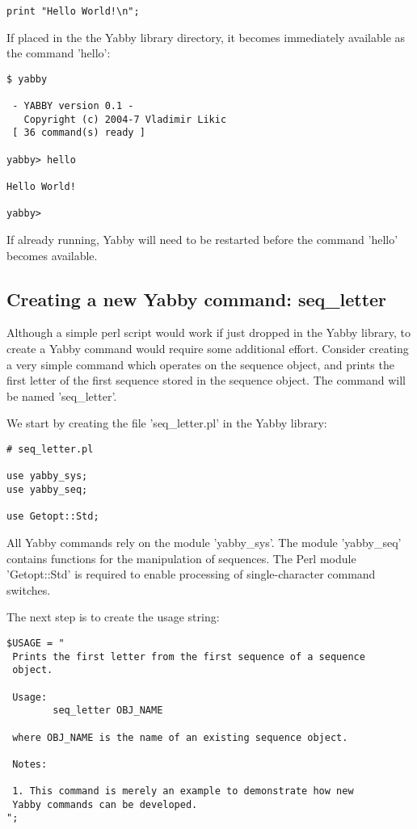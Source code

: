 \begin{verbatim}
print "Hello World!\n";
\end{verbatim}

If placed in the the Yabby library directory, it becomes immediately
available as the command 'hello':

\begin{verbatim}
$ yabby

 - YABBY version 0.1 - 
   Copyright (c) 2004-7 Vladimir Likic
 [ 36 command(s) ready ]

yabby> hello

Hello World!

yabby>
\end{verbatim}

If already running, Yabby will need to be restarted before the command
'hello' becomes available.

\subsection{Creating a new Yabby command: seq\_letter}

Although a simple perl script would work if just dropped in the Yabby
library, to create a Yabby command would require some additional effort.
Consider creating a very simple command which operates on the sequence
object, and prints the first letter of the first sequence stored in
the sequence object. The command will be named 'seq\_letter'.

We start by creating the file 'seq\_letter.pl' in the Yabby library:

\begin{verbatim}
# seq_letter.pl

use yabby_sys;
use yabby_seq;

use Getopt::Std;
\end{verbatim}

All Yabby commands rely on the module 'yabby\_sys'. The module 'yabby\_seq'
contains functions for the manipulation of sequences. The Perl module
'Getopt::Std' is required to enable processing of single-character
command switches.

The next step is to create the usage string:

\begin{verbatim}
$USAGE = "
 Prints the first letter from the first sequence of a sequence
 object. 

 Usage:
        seq_letter OBJ_NAME

 where OBJ_NAME is the name of an existing sequence object.

 Notes:

 1. This command is merely an example to demonstrate how new
 Yabby commands can be developed.
";
\end{verbatim}

